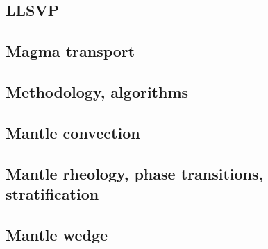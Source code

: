 \subsection*{LLSVP}

\cite{limc13}

\subsection*{Magma transport}

\cite{yatd12}

\subsection*{Methodology, algorithms}

\cite{leka93}

\subsection*{Mantle convection}

\cite{hemw75}
\cite{ludt79}
\cite{olco80}\cite{jamc80}
\cite{jape82}\cite{homc82}
\cite{hous83}\cite{hous83b}
\cite{olyb84}\cite{jarv84}\cite{haeb84}\cite{harp84}\cite{davi84}
\cite{jarv85}
\cite{davi86}
\cite{yuqh87}
\cite{zhch93}\cite{jarv93}
\cite{haeb94}
\cite{zhgu95}
\cite{zhyu96}\cite{hond96}\cite{rytr96a}\cite{rytr96b}
\cite{hond97}\cite{iwho97}
\cite{ande98}\cite{iwho98}\cite{devv98}
\cite{duyr99}
\cite{albe00}\cite{hayu00}\cite{devv00b}
\cite{zhzm00}
\cite{hapa03}
\cite{nake07}
\cite{lowm11}\cite{rota11}
\cite{holj13}\cite{dadb13}
\cite{arfw14}\cite{helo14}

\subsection*{Mantle rheology, phase transitions, stratification}

\cite{yusb82}
\cite{zhyh92}
\cite{zhyu95}
\cite{java11}

\subsection*{Mantle wedge}

